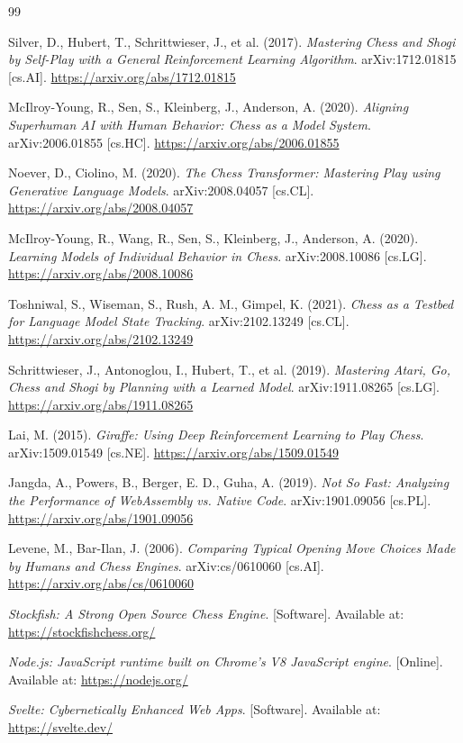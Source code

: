 \documentclass[12pt,a4paper]{article}
\begin{document}
\newpage
{}
\begin{thebibliography}{99}

Silver, D., Hubert, T., Schrittwieser, J., et al. (2017).
\textit{Mastering Chess and Shogi by Self-Play with a General Reinforcement Learning Algorithm}.
arXiv:1712.01815 [cs.AI].
\url{https://arxiv.org/abs/1712.01815}

McIlroy-Young, R., Sen, S., Kleinberg, J., Anderson, A. (2020).
\textit{Aligning Superhuman AI with Human Behavior: Chess as a Model System}.
arXiv:2006.01855 [cs.HC].
\url{https://arxiv.org/abs/2006.01855}

Noever, D., Ciolino, M. (2020).
\textit{The Chess Transformer: Mastering Play using Generative Language Models}.
arXiv:2008.04057 [cs.CL].
\url{https://arxiv.org/abs/2008.04057}

McIlroy-Young, R., Wang, R., Sen, S., Kleinberg, J., Anderson, A. (2020).
\textit{Learning Models of Individual Behavior in Chess}.
arXiv:2008.10086 [cs.LG].
\url{https://arxiv.org/abs/2008.10086}

Toshniwal, S., Wiseman, S., Rush, A. M., Gimpel, K. (2021).
\textit{Chess as a Testbed for Language Model State Tracking}.
arXiv:2102.13249 [cs.CL].
\url{https://arxiv.org/abs/2102.13249}

Schrittwieser, J., Antonoglou, I., Hubert, T., et al. (2019).
\textit{Mastering Atari, Go, Chess and Shogi by Planning with a Learned Model}.
arXiv:1911.08265 [cs.LG].
\url{https://arxiv.org/abs/1911.08265}

Lai, M. (2015).
\textit{Giraffe: Using Deep Reinforcement Learning to Play Chess}.
arXiv:1509.01549 [cs.NE].
\url{https://arxiv.org/abs/1509.01549}

Jangda, A., Powers, B., Berger, E. D., Guha, A. (2019).
\textit{Not So Fast: Analyzing the Performance of WebAssembly vs. Native Code}.
arXiv:1901.09056 [cs.PL].
\url{https://arxiv.org/abs/1901.09056}

Levene, M., Bar-Ilan, J. (2006).
\textit{Comparing Typical Opening Move Choices Made by Humans and Chess Engines}.
arXiv:cs/0610060 [cs.AI].
\url{https://arxiv.org/abs/cs/0610060}

\textit{Stockfish: A Strong Open Source Chess Engine}.
[Software]. Available at: \url{https://stockfishchess.org/}

\textit{Node.js: JavaScript runtime built on Chrome's V8 JavaScript engine}.
[Online]. Available at: \url{https://nodejs.org/}

\textit{Svelte: Cybernetically Enhanced Web Apps}.
[Software]. Available at: \url{https://svelte.dev/}

\end{thebibliography}
\end{document}
